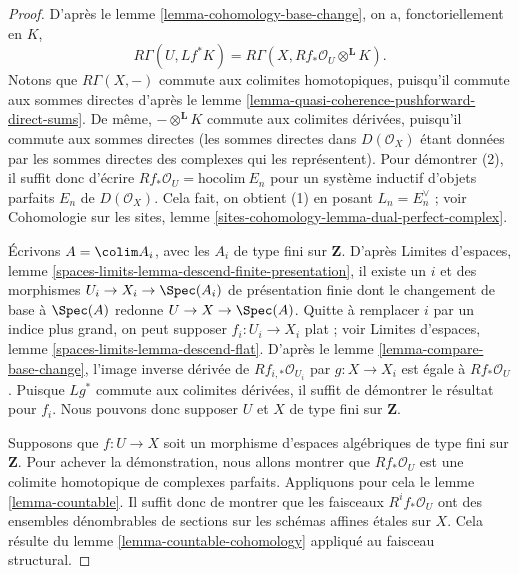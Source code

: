 \begin{proof}
D'apr\`es le lemme \ref{lemma-cohomology-base-change}, on a, fonctoriellement
en $K$,
$$
R\Gamma(U, Lf^*K) = R\Gamma(X, Rf_*\mathcal{O}_U \otimes^\mathbf{L} K).
$$
Notons que $R\Gamma(X,-)$ commute aux colimites homotopiques, puisqu'il commute
aux sommes directes d'apr\`es le lemme
\ref{lemma-quasi-coherence-pushforward-direct-sums}. De m\^eme,
$-\otimes^\mathbf{L}K$ commute aux colimites d\'eriv\'ees, puisqu'il commute aux
sommes directes (les sommes directes dans $D(\mathcal{O}_X)$ \'etant donn\'ees
par les sommes directes des complexes qui les repr\'esentent). Pour d\'emontrer
(2), il suffit donc d'\'ecrire
$Rf_*\mathcal{O}_U=\text{hocolim}\ E_n$ pour un syst\`eme inductif d'objets
parfaits $E_n$ de $D(\mathcal{O}_X)$. Cela fait, on obtient (1) en posant
$L_n=E_n^\vee$ ; voir Cohomologie sur les sites, lemme
\ref{sites-cohomology-lemma-dual-perfect-complex}.

\medskip\noindent
\'Ecrivons $A=\colim A_i$, avec les $A_i$ de type fini sur $\mathbf{Z}$.
D'apr\`es Limites d'espaces, lemme
\ref{spaces-limits-lemma-descend-finite-presentation}, il existe un $i$ et des
morphismes $U_i\to X_i\to\Spec(A_i)$ de pr\'esentation finie dont le changement
de base \`a $\Spec(A)$ redonne $U\to X\to\Spec(A)$.
Quitte \`a remplacer $i$ par un indice plus grand, on peut supposer $f_i:U_i\to X_i$ plat ; voir
Limites d'espaces, lemme \ref{spaces-limits-lemma-descend-flat}.
D'apr\`es le lemme \ref{lemma-compare-base-change}, l'image inverse d\'eriv\'ee
de $Rf_{i,*}\mathcal{O}_{U_i}$ par $g:X\to X_i$ est \'egale \`a
$Rf_*\mathcal{O}_U$. Puisque $Lg^*$ commute aux colimites d\'eriv\'ees, il
suffit de d\'emontrer le r\'esultat pour $f_i$. Nous pouvons donc supposer $U$
et $X$ de type fini sur $\mathbf{Z}$.

\medskip\noindent
Supposons que $f:U\to X$ soit un morphisme d'espaces alg\'ebriques de type fini
sur $\mathbf{Z}$. Pour achever la d\'emonstration, nous allons montrer que
$Rf_*\mathcal{O}_U$ est une colimite homotopique de complexes parfaits.
Appliquons pour cela le lemme \ref{lemma-countable}. Il suffit donc de montrer
que les faisceaux $R^if_*\mathcal{O}_U$ ont des ensembles d\'enombrables de
sections sur les sch\'emas affines \'etales sur $X$. Cela r\'esulte du lemme
\ref{lemma-countable-cohomology} appliqu\'e au faisceau structural.
\end{proof}









